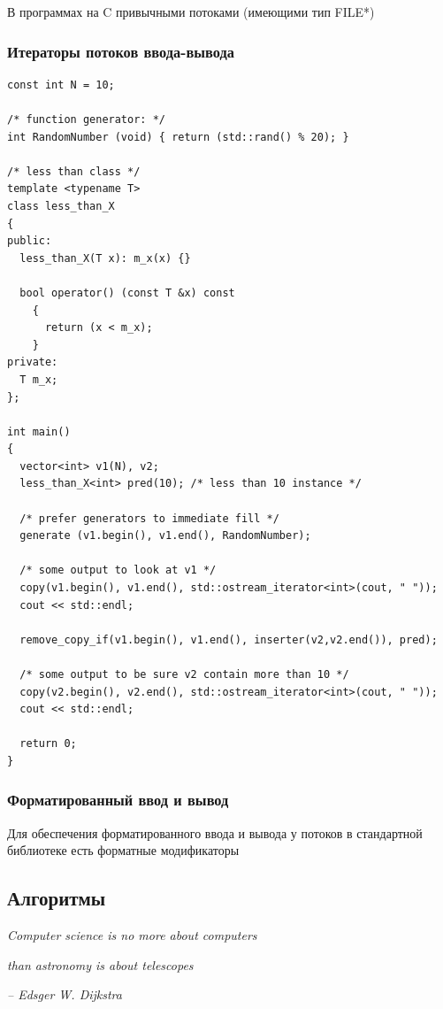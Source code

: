\documentclass[a4paper,12pt,oneside]{article}
\begin{document}
В программах на C привычными потоками (имеющими тип FILE*)

\subsubsection{Итераторы потоков ввода-вывода}

\begin{lstlisting}
const int N = 10;

/* function generator: */
int RandomNumber (void) { return (std::rand() % 20); }

/* less than class */
template <typename T>
class less_than_X
{
public:
  less_than_X(T x): m_x(x) {}

  bool operator() (const T &x) const
    {
      return (x < m_x);
    }
private:
  T m_x;
};

int main() 
{
  vector<int> v1(N), v2;
  less_than_X<int> pred(10); /* less than 10 instance */

  /* prefer generators to immediate fill */
  generate (v1.begin(), v1.end(), RandomNumber);

  /* some output to look at v1 */
  copy(v1.begin(), v1.end(), std::ostream_iterator<int>(cout, " "));
  cout << std::endl;

  remove_copy_if(v1.begin(), v1.end(), inserter(v2,v2.end()), pred);

  /* some output to be sure v2 contain more than 10 */
  copy(v2.begin(), v2.end(), std::ostream_iterator<int>(cout, " "));
  cout << std::endl;

  return 0;
}
\end{lstlisting}

\subsubsection{Форматированный ввод и вывод}

Для обеспечения форматированного ввода и вывода у потоков в стандартной библиотеке есть форматные модификаторы

\pagebreak
\subsection{Алгоритмы}

\hfill\textit{Computer science is no more about computers}

\hfill\textit{than astronomy is about telescopes}{\vspace{0.5em}}

\hfill\textit{-- Edsger W. Dijkstra}
\end{document}
